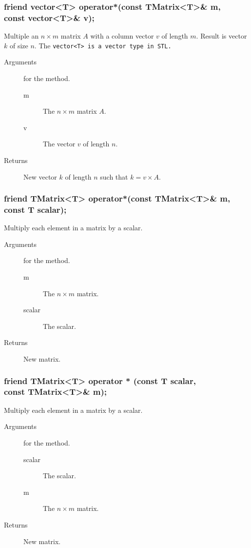 \subsubsection{friend vector<T> operator*(const TMatrix<T>\& m,\\
                                          const vector<T>\& v);}
Multiple an $n \times m$ matrix $A$ with a column vector $v$ of length $m$. 
Result is vector $k$ of size $n$. The \tt vector<T> \rm is a vector 
type in STL.

\begin{description}
  \item[Arguments] for the method.
   \begin{description}
     \item [m] The $n \times m$ matrix $A$.
     \item [v] The vector $v$ of length $n$.
   \end{description} 
  \item [Returns] New vector $k$ of length $n$ such that  $k = v \times A$.
\end{description}

\subsubsection{friend TMatrix<T> operator*(const TMatrix<T>\& m,\\
    	                                   const T scalar);}
Multiply each element in a matrix by a scalar.

\begin{description}
  \item[Arguments] for the method.
   \begin{description}
     \item [m] The $n \times m$ matrix.
     \item [scalar] The scalar.
   \end{description} 
  \item [Returns] New matrix.
\end{description}

\subsubsection{friend TMatrix<T> operator * (const T scalar,\\
	                                     const TMatrix<T>\& m);}
Multiply each element in a matrix by a scalar.

\begin{description}
  \item[Arguments] for the method.
   \begin{description}
     \item [scalar] The scalar.
     \item [m] The $n \times m$ matrix.
   \end{description} 
  \item [Returns] New matrix.
\end{description}

